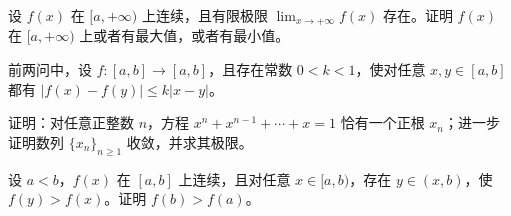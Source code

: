 \newpage
\noindent\begin{minipage}{\textwidth}
设 $f(x)$ 在 $[a,+\infty)$ 上连续，且有限极限 $\displaystyle\lim_{x\to+\infty}f(x)$ 存在。证明 $f(x)$ 在 $[a,+\infty)$ 上或者有最大值，或者有最小值。
\end{minipage}\par\vfill
\noindent\begin{minipage}{\textwidth}
前两问中，设 $f:[a,b]\to[a,b]$，且存在常数 $0<k<1$，使对任意 $x,y\in[a,b]$ 都有 $|f(x)-f(y)|\le k|x-y|$。
\end{minipage}\par\vfill
\noindent\begin{minipage}{\textwidth}
证明：对任意正整数 $n$，方程 $x^n+x^{n-1}+\cdots+x=1$ 恰有一个正根 $x_n$；进一步证明数列 $\{x_n\}_{n\ge1}$ 收敛，并求其极限。
\end{minipage}\par\vfill
\noindent\begin{minipage}{\textwidth}
设 $a<b$，$f(x)$ 在 $[a,b]$ 上连续，且对任意 $x\in[a,b)$，存在 $y\in(x,b)$，使 $f(y)>f(x)$。证明 $f(b)>f(a)$。
\end{minipage}\par\vfill
